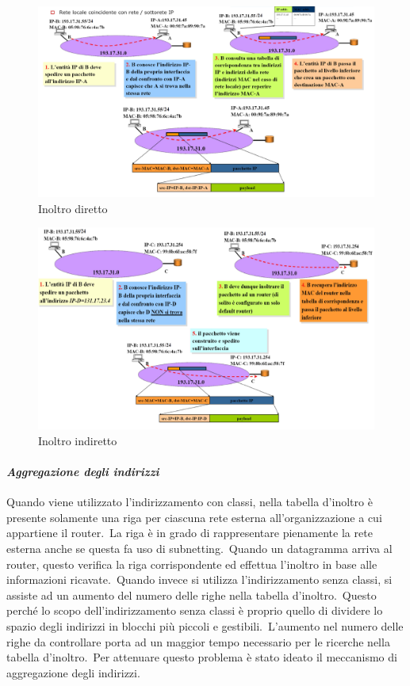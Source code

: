 \begin{figure}[H]
    \centering
    \includegraphics[width=\textwidth]{immagini/Inoltro_diretto.png}
    \caption*{Inoltro diretto}
\end{figure}

\begin{figure}[H]
    \centering
    \includegraphics[width=\textwidth]{immagini/Inoltro_indiretto.png}
    \caption*{Inoltro indiretto}
\end{figure}

\paragraph{\emph{Aggregazione degli indirizzi}}

Quando viene utilizzato l'indirizzamento con classi, nella tabella d'inoltro è presente solamente una riga per ciascuna rete esterna all'organizzazione a cui appartiene il router.\
La riga è in grado di rappresentare pienamente la rete esterna anche se questa fa uso di subnetting.\
Quando un datagramma arriva al router, questo verifica la riga corrispondente ed effettua l'inoltro in base alle informazioni ricavate.\
Quando invece si utilizza l'indirizzamento senza classi, si assiste ad un aumento del numero delle righe nella tabella d'inoltro.\
Questo perché lo scopo dell'indirizzamento senza classi è proprio quello di dividere lo spazio degli indirizzi in blocchi più piccoli e gestibili.\
L'aumento nel numero delle righe da controllare porta ad un maggior tempo necessario per le ricerche nella tabella d'inoltro.\
Per attenuare questo problema è stato ideato il meccanismo di aggregazione degli indirizzi.

